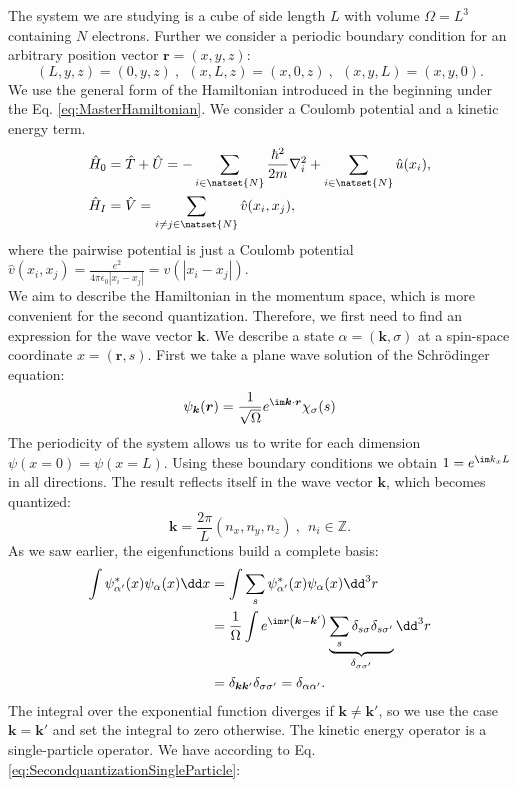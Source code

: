 \documentclass[../main.tex]{subfile}
\begin{document}
The system we are studying is a cube of side length $L$ with volume $\Omega = L^3$ containing $N$ electrons. Further we consider a periodic boundary condition for an arbitrary 
position vector $\bm{r} = (x,y,z)$:
\[
    (L,y,z) = (0,y,z)~,~~(x,L,z) = (x,0,z)~,~~(x,y,L) = (x,y,0).
\]  
We use the general form of the Hamiltonian introduced in the beginning under the Eq. \ref{eq:MasterHamiltonian}. We consider a Coulomb potential and a kinetic energy term.
\begin{align}
    \hat{H}_0 &= \hat{T}+\hat{U} =- \sum_{i\in \natset{N}} \frac{\hbar^2}{2m}\nabla_i^2 + \sum_{i\in \natset{N}} \hat{u}(x_i),\\
    \hat{H}_I &= \hat{V}= \sum_{i\neq j \in \natset{N}} \hat{v}(x_i, x_j),
\end{align} 
where the pairwise potential is just a Coulomb potential $\hat{v}(x_i, x_j) = \frac{e^2}{4\pi\epsilon_0|x_i - x_j|} = v(|x_i - x_j|)$.\\
We aim to describe the Hamiltonian in the momentum space, which is more convenient for the second quantization. Therefore, we first
need to find an expression for the wave vector $\bm{k}$. We describe a state $\alpha = (\bm{k}, \sigma)$ at a spin-space coordinate $x = (\bm{r}, s)$.
 First we take a plane wave solution of the Schrödinger equation:
\[
    \psi_{\bm{k}}(\bm{r}) = \frac{1}{\sqrt{\Omega}} e^{\im \bm{k}\cdot\bm{r}} \chi_\sigma(s)
\]
The periodicity of the system allows us to write for each dimension $\psi(x=0) = \psi(x=L)$. Using these boundary conditions we obtain 
$1= e^{\im k_x L}$ in all directions. The result reflects itself in the wave vector $\bm{k}$, which becomes quantized:
\[
    \bm{k} = \frac{2\pi}{L}(n_x, n_y, n_z)~,~~n_i\in \mathbb{Z}.
\]
As we saw earlier, the eigenfunctions build a complete basis:
\begin{align*}
    \int \psi^{\ast}_{\alpha'}(x) \psi_{\alpha}(x) \dd x &= \int \sum_{s} \psi^{\ast}_{\alpha'}(x) \psi_{\alpha}(x) \dd^3r \\
    &=\frac{1}{\Omega} \int e^{\im\bm{r}\left(\bm{k}- \bm{k}'\right)} \underbrace{\sum_s \delta_{s\sigma}\delta_{s\sigma'}}_{\delta_{\sigma\sigma'}} \dd^3 r\\
    &= \delta_{\bm{k}\bm{k}'}\delta_{\sigma\sigma'} = \delta_{\alpha\alpha'}.
\end{align*}    
The integral over the exponential function diverges if $\bm{k} \neq \bm{k}'$, so we use the case $\bm{k} = \bm{k}'$ and set the integral to zero otherwise.
The kinetic energy operator is a single-particle operator. We have according to Eq. \ref{eq:SecondquantizationSingleParticle}:
\end{document}
